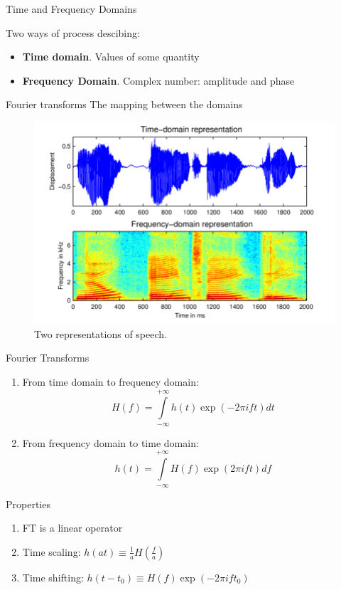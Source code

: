 \documentclass[10pt]{beamer}
\begin{document}
\begin{frame}[t]{Time and Frequency Domains}

Two ways of process descibing:

\begin{itemize}
    \item \textbf{Time domain}. Values of some quantity
    
    \item \textbf{Frequency Domain}. Complex number: amplitude and phase 
\end{itemize}

\begin{block}{Fourier transforms}
The mapping between the domains
\end{block}

    \begin{figure}
        \centering
        \includegraphics[width=.7\textwidth]{domains.png}
        \caption{Two representations of speech.}
    \end{figure}

\end{frame}


\begin{frame}{Fourier Transforms}

\begin{enumerate}
    \item From time domain to frequency domain:
    \begin{equation}
        H(f) = \int \limits_{-\infty}^{+\infty} h(t) \exp({-2\pi ift}) dt 
    \end{equation}
    
    \item From frequency domain to time domain:
    \begin{equation}
        h(t) = \int \limits_{-\infty}^{+\infty} H(f) \exp({2\pi ift}) df
    \end{equation}
\end{enumerate}


\begin{block}{Properties}
\begin{enumerate}
    \item FT is a linear operator
    \item Time scaling: $h(at) \equiv \frac{1}{a}H(\frac{f}{a})$
    \item Time shifting: $h(t-t_0) \equiv H(f) \exp(-2\pi ift_0)$ 
\end{enumerate}

\end{block}

    
\end{frame}
\end{document}
